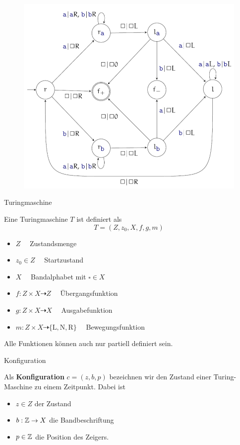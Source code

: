 \begin{frame}
	\vspace{-30pt}
	\begin{figure}[H]
		\centering
		\includegraphics[scale=0.45]{turing/Palindrom}
	\end{figure}
\end{frame}

\begin{frame}{Turingmaschine}
	\begin{Definition}
		Eine Turingmaschine $T$ ist definiert als $$ T = (Z, z_0 , X, f,g, m)$$
		\begin{itemize}[<+->]
			\item $Z \quad$ Zustandsmenge 
			\item $z_0\in Z \quad$ Startzustand
			\item $X \quad$ Bandalphabet mit $\square \in X$
			\item $f:Z\times X \dashrightarrow Z \quad$ Übergangsfunktion
			\item $g:Z\times X\dashrightarrow X \quad$ Ausgabefunktion 
			\item $m:Z\times X \dashrightarrow \{\text{L},\text{N},\text{R}\} \quad$ Bewegungsfunktion
		\end{itemize}
		\pause
		Alle Funktionen können auch nur partiell definiert sein.
	\end{Definition}
\end{frame}


\begin{frame}{Konfiguration}
	\begin{Definition}
		Als \textbf{Konfiguration} $ c =(z,b,p)$ bezeichnen wir den Zustand einer Turing-Maschine zu einem Zeitpunkt. Dabei ist 
		\begin{itemize}
			\item $z\in Z$ der Zustand
			\item $b: \mathbb{Z}\to X$ die Bandbeschriftung
			\item $p\in \mathbb{Z}$ die Position des Zeigers.
		\end{itemize}
	\end{Definition}
\end{frame}

